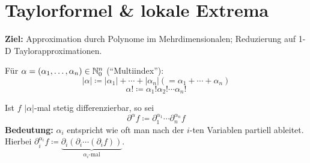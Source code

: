 \section{Taylorformel \& lokale Extrema}
\textbf{Ziel:} Approximation durch Polynome im Mehrdimensionalen; Reduzierung auf 1-D Taylorapproximationen.

\begin{definition*}[Notation]
	Für $ \alpha = \left( \alpha_1, \dotsc, \alpha_n \right) \in \mathbb{N} _0^n $ (``Multiindex''):
	\[
		\left| \alpha \right| \coloneqq \left| \alpha_1 \right| + \dotsb + \left| \alpha_n \right| (= \alpha_1 + \dotsb + \alpha_n)
	\]
	\[
		\alpha! \coloneqq \alpha_1!\alpha_2!\dotsb\alpha_n!
	\]
\end{definition*}

Ist $ f $ $ \left| \alpha \right|  $-mal stetig differenzierbar, so sei
\[
	\partial ^{\alpha} f \coloneqq \partial_1^{\alpha_1} \dotsb \partial_n^{\alpha_n} f
\]
\textbf{Bedeutung:} $ \alpha_i $ entspricht wie oft man nach der $ i $-ten Variablen partiell ableitet.
Hierbei $ \partial_i^{\alpha_i} f \coloneqq \underbrace{\partial_i \left( \partial_i \dotsb \left( \partial_i f \right)  \right) }_{\alpha_i \text{-mal} } $.

